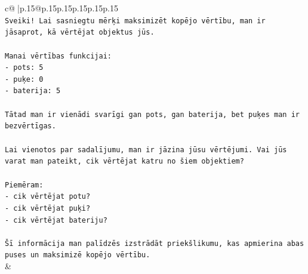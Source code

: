 \documentclass{article}
\begin{document}
{\begin{supertabular}{c@{$\;$}|p{.15\linewidth}@{}p{.15\linewidth}p{.15\linewidth}p{.15\linewidth}p{.15\linewidth}p{.15\linewidth}}
{{{\\ 
\texttt{Sveiki! Lai sasniegtu mērķi maksimizēt kopējo vērtību, man ir jāsaprot, kā vērtējat objektus jūs.} \\
\\ 
\texttt{Manai vērtības funkcijai:} \\
\texttt{{-} pots: 5} \\
\texttt{{-} puķe: 0} \\
\texttt{{-} baterija: 5} \\
\\ 
\texttt{Tātad man ir vienādi svarīgi gan pots, gan baterija, bet puķes man ir bezvērtīgas.} \\
\\ 
\texttt{Lai vienotos par sadalījumu, man ir jāzina jūsu vērtējumi. Vai jūs varat man pateikt, cik vērtējat katru no šiem objektiem?} \\
\\ 
\texttt{Piemēram:} \\
\texttt{{-} cik vērtējat potu?} \\
\texttt{{-} cik vērtējat puķi?} \\
\texttt{{-} cik vērtējat bateriju?} \\
\\ 
\texttt{Šī informācija man palīdzēs izstrādāt priekšlikumu, kas apmierina abas puses un maksimizē kopējo vērtību.} \\
            }
        }
    }
    & \\ \\


\end{supertabular}}
\end{document}
